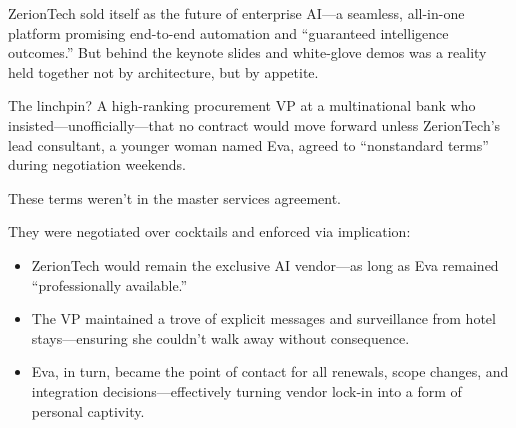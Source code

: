 ZerionTech sold itself as the future of enterprise AI—a seamless, all-in-one platform promising end-to-end automation and “guaranteed intelligence outcomes.” But behind the keynote slides and white-glove demos was a reality held together not by architecture, but by appetite.

The linchpin? A high-ranking procurement VP at a multinational bank who insisted—unofficially—that no contract would move forward unless ZerionTech’s lead consultant, a younger woman named Eva, agreed to ``nonstandard terms'' during negotiation weekends.

These terms weren’t in the master services agreement.


They were negotiated over cocktails and enforced via implication:
\begin{itemize}
    \item ZerionTech would remain the exclusive AI vendor—as long as Eva remained “professionally available.”
    \item The VP maintained a trove of explicit messages and surveillance from hotel stays—ensuring she couldn’t walk away without consequence.
    \item Eva, in turn, became the point of contact for all renewals, scope changes, and integration decisions—effectively turning vendor lock-in into a form of personal captivity.
\end{itemize}

